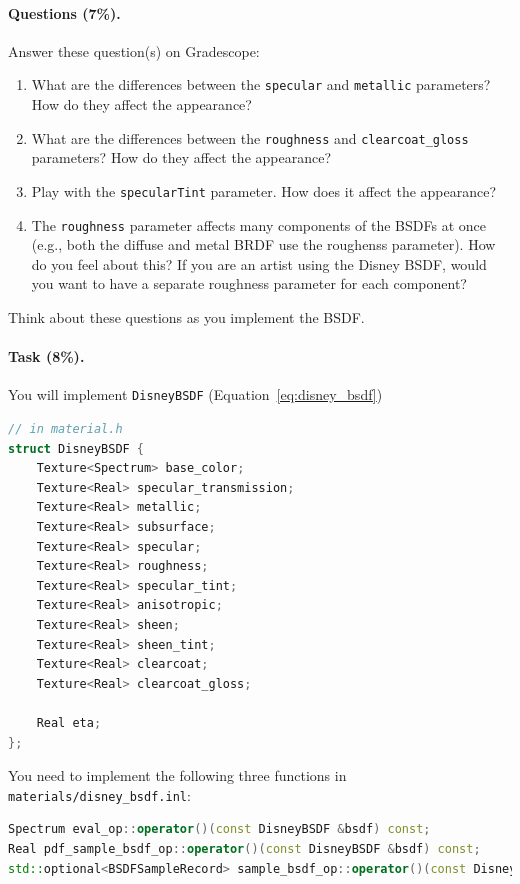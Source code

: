 \paragraph{Questions (7\%).} Answer these question(s) on Gradescope:
\begin{enumerate}
    \item What are the differences between the \lstinline{specular} and \lstinline{metallic} parameters? How do they affect the appearance?
    \item What are the differences between the \lstinline{roughness} and \lstinline{clearcoat_gloss} parameters? How do they affect the appearance?
    \item Play with the \lstinline{specularTint} parameter. How does it affect the appearance?
    \item The \lstinline{roughness} parameter affects many components of the BSDFs at once (e.g., both the diffuse and metal BRDF use the roughenss parameter). How do you feel about this? If you are an artist using the Disney BSDF, would you want to have a separate roughness parameter for each component? 
\end{enumerate}
Think about these questions as you implement the BSDF.

\paragraph{Task (8\%).} You will implement \lstinline{DisneyBSDF} (Equation~\ref{eq:disney_bsdf})
\begin{lstlisting}[language=c++]
// in material.h
struct DisneyBSDF {
    Texture<Spectrum> base_color;
    Texture<Real> specular_transmission;
    Texture<Real> metallic;
    Texture<Real> subsurface;
    Texture<Real> specular;
    Texture<Real> roughness;
    Texture<Real> specular_tint;
    Texture<Real> anisotropic;
    Texture<Real> sheen;
    Texture<Real> sheen_tint;
    Texture<Real> clearcoat;
    Texture<Real> clearcoat_gloss;

    Real eta;
};
\end{lstlisting}

You need to implement the following three functions in \lstinline{materials/disney_bsdf.inl}:
\begin{lstlisting}[language=c++]
Spectrum eval_op::operator()(const DisneyBSDF &bsdf) const;
Real pdf_sample_bsdf_op::operator()(const DisneyBSDF &bsdf) const;
std::optional<BSDFSampleRecord> sample_bsdf_op::operator()(const DisneyBSDF &bsdf) const;
\end{lstlisting}

